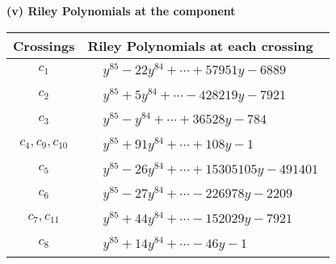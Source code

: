 \documentclass[1p]{elsarticle_modified}
\theoremstyle{definition}
\begin{document}
\newpage\renewcommand{\arraystretch}{1}
\flushleft \textbf{(v) Riley Polynomials at the component}\newline \\
\begin{tabular}{m{50pt}|m{274pt}}
Crossings & \hspace{64pt}Riley Polynomials at each crossing \\
\hline $$\begin{aligned}c_{1}\end{aligned}$$&$\begin{aligned}
&y^{85}-22 y^{84}+\cdots+57951 y-6889
\end{aligned}$\\
\hline $$\begin{aligned}c_{2}\end{aligned}$$&$\begin{aligned}
&y^{85}+5 y^{84}+\cdots-428219 y-7921
\end{aligned}$\\
\hline $$\begin{aligned}c_{3}\end{aligned}$$&$\begin{aligned}
&y^{85}- y^{84}+\cdots+36528 y-784
\end{aligned}$\\
\hline $$\begin{aligned}c_{4},c_{9},c_{10}\end{aligned}$$&$\begin{aligned}
&y^{85}+91 y^{84}+\cdots+108 y-1
\end{aligned}$\\
\hline $$\begin{aligned}c_{5}\end{aligned}$$&$\begin{aligned}
&y^{85}-26 y^{84}+\cdots+15305105 y-491401
\end{aligned}$\\
\hline $$\begin{aligned}c_{6}\end{aligned}$$&$\begin{aligned}
&y^{85}-27 y^{84}+\cdots-226978 y-2209
\end{aligned}$\\
\hline $$\begin{aligned}c_{7},c_{11}\end{aligned}$$&$\begin{aligned}
&y^{85}+44 y^{84}+\cdots-152029 y-7921
\end{aligned}$\\
\hline $$\begin{aligned}c_{8}\end{aligned}$$&$\begin{aligned}
&y^{85}+14 y^{84}+\cdots-46 y-1
\end{aligned}$\\
\hline
\end{tabular}\\~\\
\end{document}
